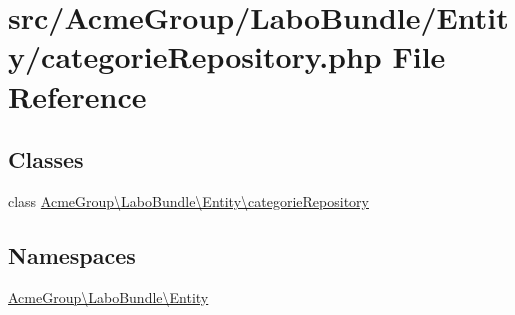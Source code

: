 \hypertarget{categorie_repository_8php}{\section{src/\+Acme\+Group/\+Labo\+Bundle/\+Entity/categorie\+Repository.php File Reference}
\label{categorie_repository_8php}
}
\subsection*{Classes}
\begin{DoxyCompactItemize}
\item 
class \hyperlink{class_acme_group_1_1_labo_bundle_1_1_entity_1_1categorie_repository}{Acme\+Group\textbackslash{}\+Labo\+Bundle\textbackslash{}\+Entity\textbackslash{}categorie\+Repository}
\end{DoxyCompactItemize}
\subsection*{Namespaces}
\begin{DoxyCompactItemize}
\item 
 \hyperlink{namespace_acme_group_1_1_labo_bundle_1_1_entity}{Acme\+Group\textbackslash{}\+Labo\+Bundle\textbackslash{}\+Entity}
\end{DoxyCompactItemize}
